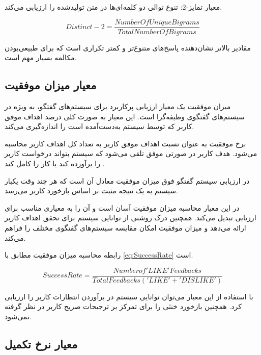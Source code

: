 معیار تمایز-2: تنوع توالی دو کلمه‌ای‌ها در متن تولیدشده را ارزیابی می‌کند.
\begin{LTR}
\begin{equation}
Distinct-2 = \frac{NumberOfUniqueBigrams}{TotalNumberOfBigrams}
\end{equation}
\end{LTR}

 مقادیر بالاتر نشان‌دهنده پاسخ‌های متنوع‌تر و کمتر تکراری است که برای طبیعی‌بودن مکالمه بسیار مهم است.

\subsection[معیار میزان موفقیت]{معیار میزان موفقیت}

میزان موفقیت یک معیار ارزیابی پرکاربرد برای سیستم‌های گفتگو، به ویژه در سیستم‌های گفتگوی وظیفه‌گرا است. این معیار به صورت کلی درصد اهداف موفق کاربر که توسط سیستم به‌دست‌آمده است را اندازه‌گیری می‌کند.

نرخ موفقیت به عنوان نسبت اهداف موفق کاربر به تعداد کل اهداف کاربر محاسبه می‌شود. هدف کاربر در صورتی موفق تلقی می‌شود که سیستم بتواند درخواست کاربر را برآورده کند یا کار را کامل کند%
\cite{sekulic2024reliable} .

در ارزیابی سیستم گفتگو فوق میزان موفقیت معادل آن است که هر چند وقت یکبار سیستم به یک نتیجه مثبت بر اساس بازخورد کاربر می‌رسد.

در این معیار محاسبه میزان موفقیت آسان است و آن‌ را به معیاری مناسب برای ارزیابی تبدیل می‌کند. همچنین درک روشنی از توانایی سیستم برای تحقق اهداف کاربر ارائه می‌دهد و میزان موفقیت امکان مقایسه سیستم‌های گفتگوی مختلف را فراهم می‌کند. 

رابطه محاسبه میزان موفقیت مطابق با 
\ref{eq:SuccessRate}
است.

\begin{LTR}
\begin{equation}
\label{eq:SuccessRate}
SuccessRate = \frac{Number of 'LIKE' Feedbacks}{Total Feedbacks ('LIKE' + 'DISLIKE')}
\end{equation}
\end{LTR}

با استفاده از این معیار می‌توان توانایی سیستم در برآوردن انتظارات کاربر را ارزیابی کرد. همچنین بازخورد خنثی را برای تمرکز بر ترجیحات صریح کاربر در نظر گرفته نمی‌شود.


\subsection[معیار نرخ تکمیل]{معیار نرخ تکمیل}


